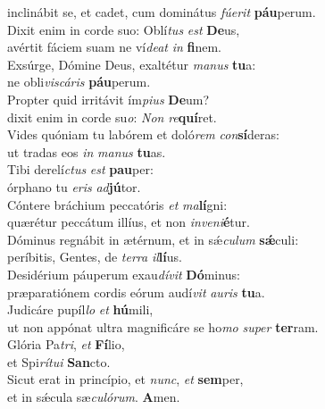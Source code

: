 \oddverse inclinábit se, et cadet, cum dominátus \textit{fú}\textit{e}\textit{rit} \textbf{páu}perum.\\
\evenverse Dixit enim in corde suo: Oblí\textit{tus} \textit{est} \textbf{De}us,~\*\\
\evenverse avértit fáciem suam ne ví\textit{de}\textit{at} \textit{in} \textbf{fi}nem.\\
\oddverse Exsúrge, Dómine Deus, exaltétur \textit{ma}\textit{nus} \textbf{tu}a:~\*\\
\oddverse ne obli\textit{vi}\textit{scá}\textit{ris} \textbf{páu}perum.\\
\evenverse Propter quid irritávit ím\textit{pi}\textit{us} \textbf{De}um?~\*\\
\evenverse dixit enim in corde su\textit{o}: \textit{Non} \textit{re}\textbf{quí}ret.\\
\oddverse Vides quóniam tu labórem et doló\textit{rem} \textit{con}\textbf{sí}deras:~\*\\
\oddverse ut tradas eos \textit{in} \textit{ma}\textit{nus} \textbf{tu}as.\\
\evenverse Tibi derelí\textit{ctus} \textit{est} \textbf{pau}per:~\*\\
\evenverse órphano tu \textit{e}\textit{ris} \textit{ad}\textbf{jú}tor.\\
\oddverse Cóntere bráchium peccatóris \textit{et} \textit{ma}\textbf{lí}gni:~\*\\
\oddverse quærétur peccátum illíus, et non \textit{in}\textit{ve}\textit{ni}\textbf{é}tur.\\
\evenverse Dóminus regnábit in ætérnum, et in sǽ\textit{cu}\textit{lum} \textbf{sǽ}culi:~\*\\
\evenverse períbitis, Gentes, de \textit{ter}\textit{ra} \textit{il}\textbf{lí}us.\\
\oddverse Desidérium páuperum exau\textit{dí}\textit{vit} \textbf{Dó}minus:~\*\\
\oddverse præparatiónem cordis eórum audí\textit{vit} \textit{au}\textit{ris} \textbf{tu}a.\\
\evenverse Judicáre pupíl\textit{lo} \textit{et} \textbf{hú}mili,~\*\\
\evenverse ut non appónat ultra magnificáre se ho\textit{mo} \textit{su}\textit{per} \textbf{ter}ram.\\
\oddverse Glória Pa\textit{tri}, \textit{et} \textbf{Fí}lio,~\*\\
\oddverse et Spi\textit{rí}\textit{tu}\textit{i} \textbf{San}cto.\\
\evenverse Sicut erat in princípio, et \textit{nunc}, \textit{et} \textbf{sem}per,~\*\\
\evenverse et in sǽcula sæ\textit{cu}\textit{ló}\textit{rum}. \textbf{A}men.\\
